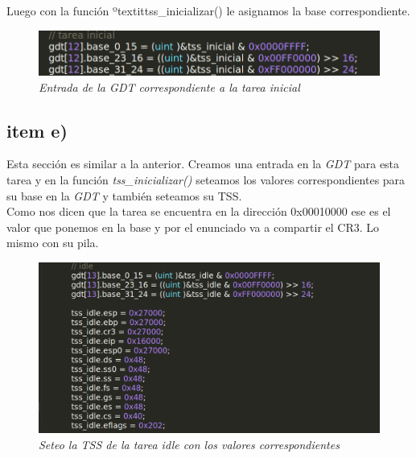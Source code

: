 Luego con la función ºtextit{tss\_inicializar()} le asignamos la base correspondiente.

\begin{figure}[H]
\begin{center}
\includegraphics[width=\linewidth]{ejercicio6/tss_inicializar_base_inicial.png}
\caption{{\small \textit{Entrada de la \textit{GDT} correspondiente a la tarea inicial }}}
\endminipage
\end{center}
\end{figure}

\subsection{item e)}
Esta sección es similar a la anterior. Creamos una entrada en la \textit{GDT} para esta tarea y en la función \textit{tss\_inicializar()} seteamos los valores correspondientes para su base en la \textit{GDT} y también seteamos su TSS.\\
Como nos dicen que la tarea se encuentra en la dirección 0x00010000 ese es el valor que ponemos en la base y por el enunciado va a compartir el CR3. Lo mismo con su pila.\\

\begin{figure}[H]
\begin{center}
\includegraphics[width=\linewidth]{ejercicio6/tss_idle.png}
\caption{{\small \textit{Seteo la TSS de la tarea idle con los valores correspondientes}}}
\endminipage
\end{center}
\end{figure}

